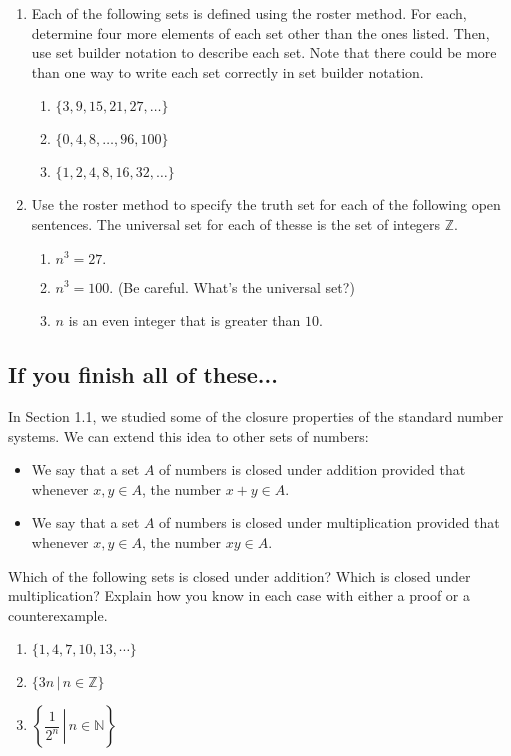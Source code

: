 \documentclass[11pt]{article}
\begin{document}
\begin{enumerate}
	\item Each of the following sets is defined using the roster method. For each, determine four more elements of each set other than the ones listed. Then, use set builder notation to describe each set. Note that there could be more than one way to write each set correctly in set builder notation. 
	\begin{enumerate}
		\item $\{ 3, 9, 15, 21, 27, \dots \}$
		\item $\{ 0, 4, 8, \dots, 96, 100\}$
		\item $\{ 1, 2, 4, 8, 16, 32, \dots \}$
	\end{enumerate}
	
	\item Use the roster method to specify the truth set for each of the following open sentences. The universal set for each of thesse is the set of integers $\mathbb{Z}$. 
	\begin{enumerate}
		\item $n^3 = 27.$
		\item $n^3 = 100$. (Be careful. What's the universal set?) 
		\item $n$ is an even integer that is greater than $10$. 
	\end{enumerate}
	
	
\end{enumerate}
	
\subsection*{If you finish all of these...}


In Section 1.1, we studied some of the closure properties of the standard number systems. We can extend this idea to other sets of numbers: 
\begin{itemize}
	\item We say that a set $A$ of numbers is closed under addition provided that whenever $x,y \in A$, the number $x+y \in A$. 
	\item We say that a set $A$ of numbers is closed under multiplication provided that whenever $x,y \in A$, the number $xy \in A$.
\end{itemize}
Which of the following sets is closed under addition? Which is closed under multiplication? Explain how you know in each case with either a proof or a counterexample. 
	\begin{enumerate}
		\item $\{ 1, 4, 7, 10, 13, \cdots \}$ 
		\item $\{ 3n \, | \, n \in \mathbb{Z} \}$
		\item ${\left\{ \left. \dfrac{1}{2^n} \, \right| \, n \in \mathbb{N}\right\}}$
	\end{enumerate}
\end{document}
